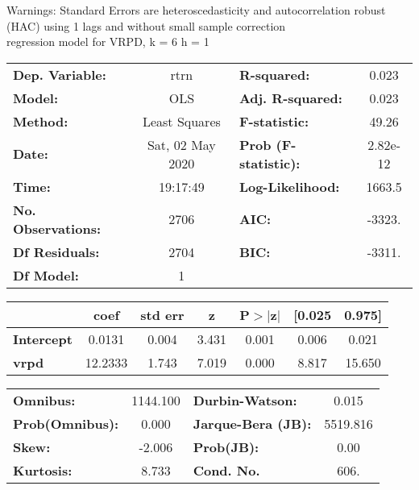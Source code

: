 Warnings: \newline
 [1] Standard Errors are heteroscedasticity and autocorrelation robust (HAC) using 1 lags and without small sample correction\\ 

regression model for VRPD, k = 6 h = 1\begin{center}
\begin{tabular}{lclc}
\toprule
\textbf{Dep. Variable:}    &       rtrn       & \textbf{  R-squared:         } &     0.023   \\
\textbf{Model:}            &       OLS        & \textbf{  Adj. R-squared:    } &     0.023   \\
\textbf{Method:}           &  Least Squares   & \textbf{  F-statistic:       } &     49.26   \\
\textbf{Date:}             & Sat, 02 May 2020 & \textbf{  Prob (F-statistic):} &  2.82e-12   \\
\textbf{Time:}             &     19:17:49     & \textbf{  Log-Likelihood:    } &    1663.5   \\
\textbf{No. Observations:} &        2706      & \textbf{  AIC:               } &    -3323.   \\
\textbf{Df Residuals:}     &        2704      & \textbf{  BIC:               } &    -3311.   \\
\textbf{Df Model:}         &           1      & \textbf{                     } &             \\
\bottomrule
\end{tabular}
\begin{tabular}{lcccccc}
                   & \textbf{coef} & \textbf{std err} & \textbf{z} & \textbf{P$> |$z$|$} & \textbf{[0.025} & \textbf{0.975]}  \\
\midrule
\textbf{Intercept} &       0.0131  &        0.004     &     3.431  &         0.001        &        0.006    &        0.021     \\
\textbf{vrpd}      &      12.2333  &        1.743     &     7.019  &         0.000        &        8.817    &       15.650     \\
\bottomrule
\end{tabular}
\begin{tabular}{lclc}
\textbf{Omnibus:}       & 1144.100 & \textbf{  Durbin-Watson:     } &    0.015  \\
\textbf{Prob(Omnibus):} &   0.000  & \textbf{  Jarque-Bera (JB):  } & 5519.816  \\
\textbf{Skew:}          &  -2.006  & \textbf{  Prob(JB):          } &     0.00  \\
\textbf{Kurtosis:}      &   8.733  & \textbf{  Cond. No.          } &     606.  \\
\bottomrule
\end{tabular}
\end{center}


